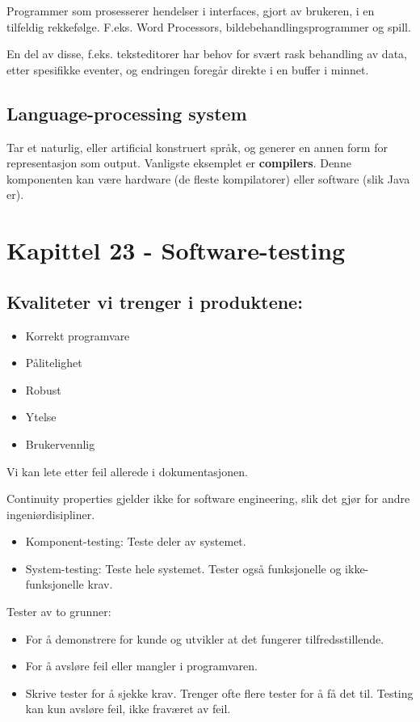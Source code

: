 \documentclass[11pt]{article}
\begin{document}
   Programmer som prosesserer hendelser i interfaces, gjort av brukeren, i en tilfeldig rekkefølge. 
   F.eks. Word Processors, bildebehandlingsprogrammer og spill.

   En del av disse, f.eks. teksteditorer har behov for svært rask behandling av data, 
   etter spesifikke eventer, og endringen foregår direkte i en buffer i minnet.
\subsection{Language-processing system}
\label{sec-8.4}

   Tar et naturlig, eller artificial konstruert språk, og generer en annen form 
   for representasjon som output. Vanligste eksemplet er \textbf{compilers}. Denne komponenten kan 
   være hardware (de fleste kompilatorer) eller software (slik Java er). 
\section{Kapittel 23 - Software-testing}
\label{sec-9}
\subsection{Kvaliteter vi trenger i produktene:}
\label{sec-9.1}

\begin{itemize}
\item Korrekt programvare
\item Pålitelighet
\item Robust
\item Ytelse
\item Brukervennlig
\end{itemize}

   Vi kan lete etter feil allerede i dokumentasjonen.
  
   Continuity properties gjelder ikke for software engineering, slik det gjør for andre ingeniørdisipliner.

\begin{itemize}
\item Komponent-testing: 
     Teste deler av systemet.
\item System-testing: 
     Teste hele systemet. Tester også funksjonelle og ikke-funksjonelle krav.
\end{itemize}

   Tester av to grunner: 
\begin{itemize}
\item For å demonstrere for kunde og utvikler at det fungerer tilfredsstillende.
\item For å avsløre feil eller mangler i programvaren.
\item Skrive tester for å sjekke krav. Trenger ofte flere tester for å få det til.
     Testing kan kun avsløre feil, ikke fraværet av feil.
\end{itemize}
\end{document}
